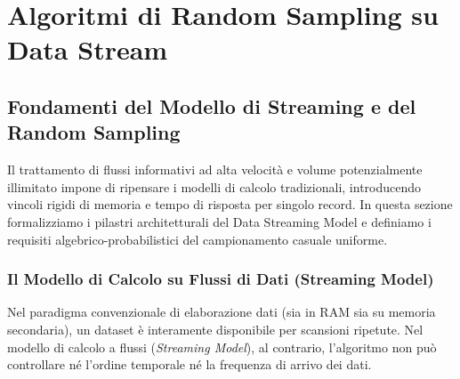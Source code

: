 \chapter{Algoritmi di Random Sampling su Data Stream}
\label{chap:random-sampling-data-streams}

\FloatBarrier
\section{Fondamenti del Modello di Streaming e del Random Sampling}
\label{sec:streaming-model-foundations}

Il trattamento di flussi informativi ad alta velocit\`a e volume potenzialmente illimitato impone di ripensare i modelli di calcolo tradizionali, introducendo vincoli rigidi di memoria e tempo di risposta per singolo record. In questa sezione formalizziamo i pilastri architetturali del Data Streaming Model e definiamo i requisiti algebrico-probabilistici del campionamento casuale uniforme.

\FloatBarrier
\subsection{Il Modello di Calcolo su Flussi di Dati (Streaming Model)}
Nel paradigma convenzionale di elaborazione dati (sia in RAM sia su memoria secondaria), un dataset è interamente disponibile per scansioni ripetute. Nel modello di calcolo a flussi (\textit{Streaming Model}), al contrario, l'algoritmo non può controllare né l'ordine temporale né la frequenza di arrivo dei dati.

